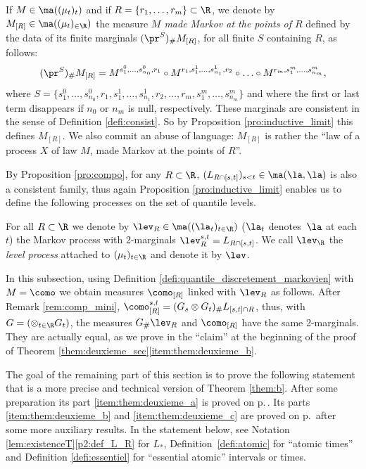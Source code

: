\begin{defi}\label{defi:quantile_discretement_markovien} If $M\in\ma((\mu_t)_t)$ and if $R=\{r_1,\ldots,r_m\}\subset\R$, we denote by $M_{[R]}\in\ma((\mu_t)_{\in\R})$ the measure \emph{$M$ made Markov at the points of $R$} defined by the data of its finite marginals $(\pr^{S})_\# M_{[R]}$, for all finite $S$ containing $R$, as follows:
\[(\pr^{S})_\# M_{[R]}= M^{s^0_1,\ldots, s^0_{n_0},r_1}\circ M^{r_1,s^1_{1},\ldots,s^1_{n_1},r_2}\circ\ldots\circ M^{r_m,s^m_{1},\ldots,s^m_{n_m}},\]
where $S=\{s^0_1,\ldots, s^0_{n_0},r_1,s^1_{1},\ldots,s^1_{n_1},r_2,\ldots,r_m,s^m_{1},\ldots,s^m_{n_m}\}$ and where the first or last term disappears if $n_0$ or $n_m$ is null, respectively. These marginals are consistent in the sense of Definition \ref{defi:consist}. So by Proposition \ref{pro:inductive_limit} this defines $M_{[R]}$. We also commit an abuse of language: $M_{[R]}$ is rather the ``law of a process $X$ of law $M$, made Markov at the points of $R$''.
\end{defi}

By Proposition \ref{pro:compo}, for any $R\subset\R$, $(L_{R\cap[s,t]})_{s<t}\in \ma(\la,\la)$ is also a consistent family, thus again Proposition \ref{pro:inductive_limit} enables us to define the following processes on the set of quantile levels.

\begin{defi}\label{defi:lev}
For all $R\subset\R$ we denote by $\lev_R\in\ma((\la_t)_{t\in\R})$ ($\la_t$ denotes~$\la$ at each $t$) the Markov process with 2-marginals $\lev_R^{s,t}=L_{R\cap[s,t]}$. We call $\lev_\R$ the \emph{level process} attached to $(\mu_t)_{t\in \R}$ and denote it by $\lev$.
\end{defi}

\begin{rem}\label{rem:mini_et_Q}In this subsection, using Definition \ref{defi:quantile_discretement_markovien} with $M=\como$ we obtain measures $\como_{[R]}$ linked with $\lev_R$ as follows. After Remark \ref{rem:comp_mini}, $\como_{[R]}^{s,t}=(G_s\otimes G_t)_\#L_{[s,t]\cap R}$, thus, with $G=(\otimes_{t\in \R} G_{t})$, the measures $G_\#\lev_R$ and $\como_{[R]}$ have the same 2-marginals. They are actually equal, as we prove in the ``claim'' at the beginning of the proof of Theorem \ref{them:deuxieme_sec}\eqref{item:them:deuxieme_b}.
\end{rem}

The goal of the remaining part of this section is to prove the following statement that is a more precise and technical version of Theorem \ref{them:b}. After some preparation its part \eqref{item:them:deuxieme_a} is proved on p.\,\pageref{proof:themBa}. Its parts \eqref{item:them:deuxieme_b} and \eqref{item:them:deuxieme_c} are proved on p.\,\pageref{proof:them:deuxieme} after some more auxiliary results. In the statement below, see Notation \ref{lem:existenceT}\eqref{p2:def_L_R} for $L_\ast$, Definition~\ref{defi:atomic} for ``atomic times'' and Definition \ref{defi:essentiel} for ``essential atomic'' intervals or times.

